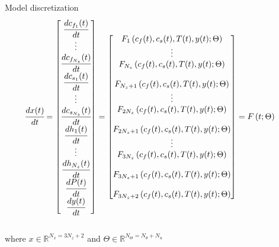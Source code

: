 \documentclass[8pt]{beamer}
\begin{document}
	\begin{frame}[fragile]{Model discretization}
		\footnotesize{
			\begin{align*}
				\cfrac{d x(t)}{d t} &= 
				\begin{bmatrix}
					\cfrac{d c_{f_1}(t)}{d t}   	\\
					\vdots					   		\\
					\cfrac{d c_{f_{N_z}}(t)}{d t} 	\\
					\cfrac{d c_{s_1}(t)}{d t}   	\\
					\vdots					   		\\
					\cfrac{d c_{s_{N_z}}(t)}{d t}	\\
					\cfrac{d h_1(t)}{d t} 	   		\\
					\vdots 					   		\\
					\cfrac{d h_{N_z}(t)}{d t} 		\\
					\cfrac{d P(t)}{dt}				\\
					\cfrac{d y(t)}{dt}
				\end{bmatrix}
				=
				\begin{bmatrix}
					F_1 \left(c_f(t),c_s(t),T(t), y(t); \Theta \right)\\ 
					\vdots\\ 
					F_{N_z} \left(c_f(t),c_s(t),T(t), y(t); \Theta \right)\\ \\
					F_{N_z+1} \left(c_f(t),c_s(t),T(t), y(t); \Theta \right)\\
					\vdots\\
					F_{2N_z} \left(c_f(t),c_s(t),T(t), y(t); \Theta \right)\\ \\
					F_{2N_z+1} \left(c_f(t),c_s(t),T(t), y(t); \Theta \right) \\
					\vdots\\
					F_{3N_z} \left(c_f(t),c_s(t),T(t), y(t); \Theta \right) \\ \\
					F_{3N_z+1} \left(c_f(t),c_s(t),T(t), y(t); \Theta \right) \\ \\
					F_{3N_z+2} \left(c_f(t),c_s(t),T(t), y(t); \Theta \right) 
				\end{bmatrix}
				= F \left( t; \Theta \right)
		\end{align*} }\\
		where $x \in \mathbb{R}^{N_x = 3N_z+2} $ and $\Theta \in \mathbb{R}^{N_\Theta =  N_{\theta} + N_u } $
	\end{frame}
\end{document}
